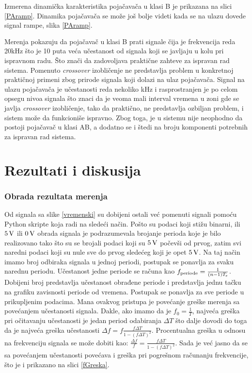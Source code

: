 \documentclass[a4paper, 12pt, diplomski]{etf}
\renewcommand{\unit}[1]{\,{\rm #1}}   %
\begin{document}
Izmerena dinamička karakteristika pojačavača u klasi B je prikazana na slici \ref{PAramp}.
Dinamika pojačavača se može još bolje videti kada se na ulazu dovede signal rampe, slika \ref{PAramp}.

Merenja pokazuju da pojačavač u klasi B prati signale čija je frekvencija reda 20kHz što je 10 puta veća učestanost od signala koji se javljaju u kolu pri ispravnom radu. Što znači da zadovoljava praktične zahteve za ispravan rad sistema. Pomenuto \textit{crossover} izobličenje ne predstavlja problem u konkretnoj praktičnoj primeni zbog prirode signala koji dolazi na ulaz pojačavača. Signal na ulazu pojačavača je učestanosti reda nekoliko kHz i rasprostranjen je po celom opsegu nivoa signala što znaci da je veoma mali interval vremena u zoni gde se javlja \textit{crossover} izobličenje, tako da praktično, ne predstavlja ozbiljan problem, i sistem može da funkcioniše ispravno. Zbog toga, je u sistemu nije neophodno da postoji pojačavač u klasi AB, a dodatno se i štedi na broju komponenti potrebnih za ispravan rad sistema.



\section{Rezultati i diskusija}



\subsubsection{Obrada rezultata merenja}
Od signala sa slike \ref{vremenski} su dobijeni ostali već pomenuti signali pomoću Python skripte koja radi na sledeći način. Pošto su podaci koji stižu binarni, ili $5 \unit{V}$ ili $0 \unit{V}$ obrada signala je podrazumevala brojanje perioda koje je bilo realizovano tako što su se brojali podaci koji su $5 \unit{V}$ počevši od prvog, zatim svi naredni podaci koji su nule sve do prvog sledećeg koji je opet $5 \unit{V}$. Na taj način imamo broj odbiraka signala u jednoj periodi, postupak se ponavlja za svaku narednu periodu. Učestanost jedne periode se računa kao $f_{\rm periode} = \frac{1}{(n-1)T_{\rm s}}$. Dobijeni broj predstavlja učestanost obrađene periode i predstavlja jednu tačku na grafiku zavisnosti periode od vremena. Postupak se ponavlja za sve periode u prikupljenim podacima. 
Mana ovakvog pristupa je povećanje greške merenja sa povećanjem učestanosti signala. Dakle, ako imamo da je $f_0 = \frac{1}{T}$, najveća greška pri očitavanju učestanosti je jedan period odabiranja $\Delta T$ što dalje dovodi do toga da je najveća greška učestanosti $\Delta f = f \frac{f \Delta T}{1 - (f \Delta T)^2}$. Procentualna greška u odnosu na frekvenciju signala se može dobiti kao: $\frac{\Delta f}{f} = \frac{f \Delta T}{1 - (f \Delta T)^2}$. Sada je već jasno da se sa povećanjem učestanosti povećava i greška pri pogrešnom računanju frekvencije, što je i prikazano na slici \ref{fGreska}.
\end{document}
